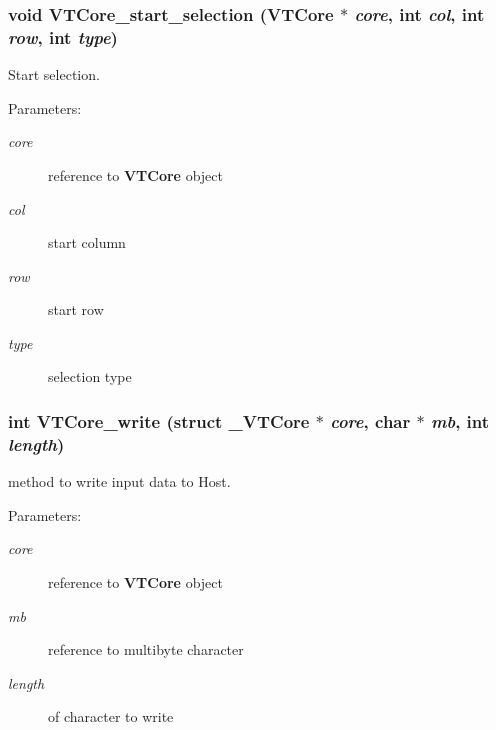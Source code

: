 \subsubsection{\setlength{\rightskip}{0pt plus 5cm}void VTCore\_\-start\_\-selection ({\bf VTCore} $\ast$ {\em core}, int {\em col}, int {\em row}, int {\em type})}\label{core_8h_a52}


Start selection.

\begin{Desc}
\item[Parameters:]
\begin{description}
\item[{\em core}]reference to {\bf VTCore} object \item[{\em col}]start column \item[{\em row}]start row \item[{\em type}]selection type \end{description}
\end{Desc}
\subsubsection{\setlength{\rightskip}{0pt plus 5cm}int VTCore\_\-write (struct \_\-VTCore $\ast$ {\em core}, char $\ast$ {\em mb}, int {\em length})}\label{core_8h_a47}


method to write input data to Host.

\begin{Desc}
\item[Parameters:]
\begin{description}
\item[{\em core}]reference to {\bf VTCore} object \item[{\em mb}]reference to multibyte character \item[{\em length}]of character to write \end{description}
\end{Desc}

